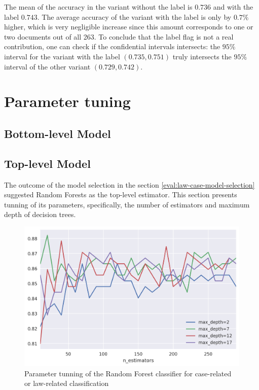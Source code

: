 \documentclass[
  digital, %
  notable,   %
  nolof,     %
  nolot,     %
]{fithesis3}
\begin{document}
The mean of the accuracy in the variant without the label is $0.736$ and with the label $0.743$.
The average accuracy of the variant with the label is only by $0.7\%$ higher, which is very negligible increase since this amount corresponds to one or two documents out of all 263. 
To conclude that the label flag is not a real contribution, one can check if the confidential intervals intersects: the $95\%$ interval for the variant with the label $(0.735, 0.751)$ truly intersects the $95\%$ interval of the other variant $(0.729, 0.742)$.



\section{Parameter tuning}
\subsection{Bottom-level Model}
\label{eval:bottom-model-tuning}

\subsection{Top-level Model}
\label{eval:law-case-model-tuning}
The outcome of the model selection in the section \ref{eval:law-case-model-selection} suggested Random Forests as the top-level estimator.
This section presents tunning of its parameters, specifically, the number of estimators and maximum depth of decision trees.

\begin{figure}[h]
\caption{Parameter tunning of the Random Forest classifier for case-related or law-related classification}
\label{fig:eval_law-case-model-tunning}
\includegraphics[width=\textwidth]{img/eval_law-case-model-tunning}
\end{figure}
\end{document}
